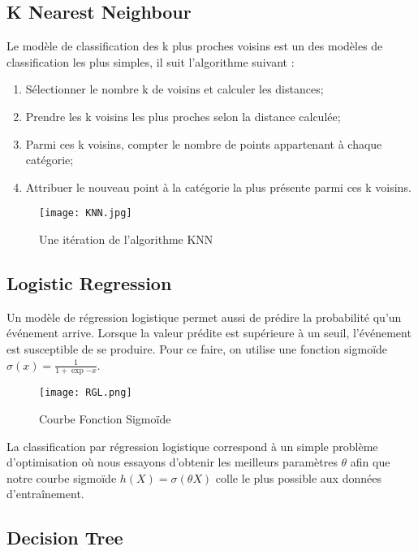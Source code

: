 \documentclass[a4paper,french,12pt]{article}
\begin{document}
\subsection{K Nearest Neighbour}

Le modèle de classification des k plus proches voisins est un des modèles de classification les plus simples, il suit l'algorithme suivant :

\begin{enumerate}
    \item Sélectionner le nombre k de voisins et calculer les distances;
    \item Prendre les k voisins les plus proches selon la distance calculée;
    \item Parmi ces k voisins, compter le nombre de points appartenant à chaque catégorie;
    \item Attribuer le nouveau point à la catégorie la plus présente parmi ces k voisins.
\end{enumerate}

\begin{figure}[!h]
    \centering
    \texttt{[image: KNN.jpg]}
    \caption{Une itération de l'algorithme KNN}
\end{figure}

\subsection{Logistic Regression}

Un modèle de régression logistique permet aussi de prédire la probabilité qu’un événement arrive. Lorsque la valeur prédite est supérieure à un seuil, l’événement est susceptible de se produire. Pour ce faire, on utilise une fonction sigmoïde $\sigma(x) = \frac{1}{1 + \exp{-x}}$.\\

\begin{figure}[!h]
    \centering
    \texttt{[image: RGL.png]}
    \caption{Courbe Fonction Sigmoïde}
\end{figure}

La classification par régression logistique correspond à un simple problème d’optimisation où nous essayons d’obtenir les meilleurs paramètres $\theta$ afin que notre courbe sigmoïde $h(X) = \sigma(\theta X)$ colle le plus possible aux données d'entraînement.

\subsection{Decision Tree}
\end{document}
